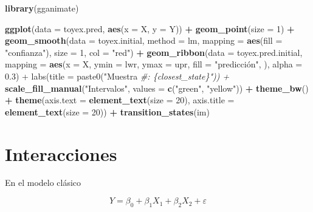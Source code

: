 \documentclass[
  12pt,
]{book}
\newenvironment{Shaded}{\begin{snugshade}}{\end{snugshade}}
\newcommand{\CommentTok}[1]{\textcolor[rgb]{0.56,0.35,0.01}{\textit{#1}}}
\newcommand{\DataTypeTok}[1]{\textcolor[rgb]{0.13,0.29,0.53}{#1}}
\newcommand{\DecValTok}[1]{\textcolor[rgb]{0.00,0.00,0.81}{#1}}
\newcommand{\KeywordTok}[1]{\textcolor[rgb]{0.13,0.29,0.53}{\textbf{#1}}}
\newcommand{\NormalTok}[1]{#1}
\newcommand{\OperatorTok}[1]{\textcolor[rgb]{0.81,0.36,0.00}{\textbf{#1}}}
\newcommand{\StringTok}[1]{\textcolor[rgb]{0.31,0.60,0.02}{#1}}
\theoremstyle{definition}
\theoremstyle{definition}
\theoremstyle{definition}
\theoremstyle{remark}
\begin{document}
\begin{Shaded}
\begin{Highlighting}[]
\KeywordTok{library}\NormalTok{(gganimate)}

\KeywordTok{ggplot}\NormalTok{(}\DataTypeTok{data =}\NormalTok{ toyex.pred, }\KeywordTok{aes}\NormalTok{(}\DataTypeTok{x =}\NormalTok{ X, }\DataTypeTok{y =}\NormalTok{ Y)) }\OperatorTok{+}\StringTok{ }\KeywordTok{geom_point}\NormalTok{(}\DataTypeTok{size =} \DecValTok{1}\NormalTok{) }\OperatorTok{+}\StringTok{ }
\StringTok{    }\KeywordTok{geom_smooth}\NormalTok{(}\DataTypeTok{data =}\NormalTok{ toyex.initial, }\DataTypeTok{method =}\NormalTok{ lm, }
        \DataTypeTok{mapping =} \KeywordTok{aes}\NormalTok{(}\DataTypeTok{fill =} \StringTok{"confianza"}\NormalTok{), }\DataTypeTok{size =} \DecValTok{1}\NormalTok{, }
        \DataTypeTok{col =} \StringTok{"red"}\NormalTok{) }\OperatorTok{+}\StringTok{ }\KeywordTok{geom_ribbon}\NormalTok{(}\DataTypeTok{data =}\NormalTok{ toyex.pred.initial, }
    \DataTypeTok{mapping =} \KeywordTok{aes}\NormalTok{(}\DataTypeTok{x =}\NormalTok{ X, }\DataTypeTok{ymin =}\NormalTok{ lwr, }\DataTypeTok{ymax =}\NormalTok{ upr, }\DataTypeTok{fill =} \StringTok{"predicción", }
\StringTok{        ), alpha = 0.3) + labs(title = paste0("}\NormalTok{Muestra }\CommentTok{#: \{closest_state\}")) + }
    \KeywordTok{scale_fill_manual}\NormalTok{(}\StringTok{"Intervalos"}\NormalTok{, }\DataTypeTok{values =} \KeywordTok{c}\NormalTok{(}\StringTok{"green"}\NormalTok{, }
        \StringTok{"yellow"}\NormalTok{)) }\OperatorTok{+}\StringTok{ }\KeywordTok{theme_bw}\NormalTok{() }\OperatorTok{+}\StringTok{ }\KeywordTok{theme}\NormalTok{(}\DataTypeTok{axis.text =} \KeywordTok{element_text}\NormalTok{(}\DataTypeTok{size =} \DecValTok{20}\NormalTok{), }
    \DataTypeTok{axis.title =} \KeywordTok{element_text}\NormalTok{(}\DataTypeTok{size =} \DecValTok{20}\NormalTok{)) }\OperatorTok{+}\StringTok{ }\KeywordTok{transition_states}\NormalTok{(im)}
\end{Highlighting}
\end{Shaded}

\hypertarget{interacciones}{%
\section{Interacciones}\label{interacciones}}

En el modelo clásico

\begin{equation*}
Y = \beta_{0} + \beta_{1} X_{1} + \beta_{2} X_{2} + \varepsilon
\end{equation*}
\end{document}
